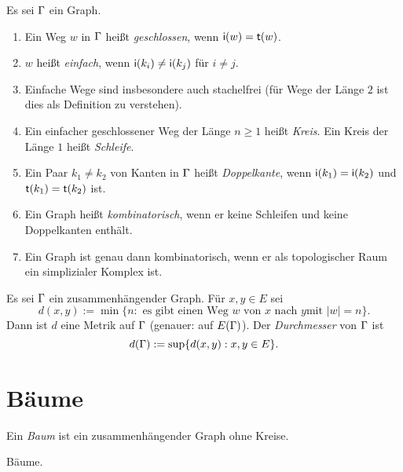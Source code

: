 \DB Es sei $\Gamma$ ein Graph.
\begin{enumerate}
\item Ein Weg $w$ in $\Gamma$ heißt \emph{geschlossen},
wenn $\mathsf{i}(w)=\mathsf{t}(w)$.
\item $w$ heißt \emph{einfach},
wenn $\mathsf{i}(k_i)\neq\mathsf{i}(k_j)$ für $i\neq j$.
\item Einfache Wege sind insbesondere auch stachelfrei (für Wege
der Länge $2$ ist dies als Definition zu verstehen).
\item Ein einfacher geschlossener Weg der Länge $n\geq 1$ heißt
\emph{Kreis}.
Ein Kreis der Länge $1$ heißt \emph{Schleife}.
\begin{center}
\end{center}
\item Ein Paar $k_1\neq k_2$ von Kanten in $\Gamma$ heißt \emph{Doppelkante},
wenn $\mathsf{i}(k_1)=\mathsf{i}(k_2)$ und $\mathsf{t}(k_1)=\mathsf{t}(k_2)$ ist.
\begin{center}
\end{center}
\item Ein Graph heißt \emph{kombinatorisch},
wenn er keine Schleifen und keine Doppelkanten enthält.
\item Ein Graph ist genau dann kombinatorisch, wenn er als
topologischer Raum ein simplizialer Komplex ist.
\end{enumerate}

\DB Es sei $\Gamma$ ein zusammenhängender Graph. Für $x,y\in E$ sei
\[
d(x,y) := \min\{ n : \text{ es gibt einen Weg $w$ von $x$ nach $y$
	mit $|w|=n$} \}.
\]
Dann ist $d$ eine Metrik auf $\Gamma$ (genauer: auf $E(\Gamma)$).
Der \emph{Durchmesser} von $\Gamma$ ist
\[
d(\Gamma) := \sup\{ d(x,y) : x,y\in E\}.
\]

\section{Bäume}\label{sec_baum}

\DEF Ein \emph{Baum} ist ein
zusammenhängender Graph ohne Kreise.

\BSP Bäume.
\begin{center}
\end{center}


